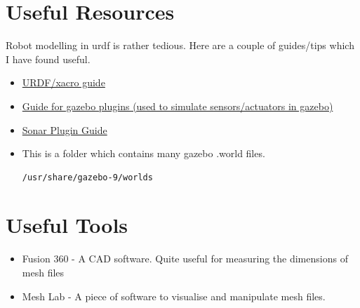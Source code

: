 \documentclass[11pt]{article}
\begin{document}
\tableofcontents

\section{Useful Resources}
Robot modelling in urdf is rather tedious. Here are a couple of guides/tips which I have found useful.


\begin{itemize}
 \item {
       \href{https://nu-msr.github.io/me495_site/lecture06_modeling.html}{URDF/xacro guide}
       }
 \item{
       \href{   https://classic.gazebosim.org/tutorials?tut=ros_gzplugins}{Guide for gazebo plugins (used to simulate sensors/actuators in gazebo)}
       }
 \item{
       \href{
        https://medium.com/teamarimac/integrating-sonar-and-ir-sensor-plugin-to-robot-model-in-gazebo-with-ros-656fd9452607
       }{Sonar Plugin Guide}
       }
 \item{
       This is a folder which contains many gazebo .world files.
       \begin{lstlisting}[language=bash]
        /usr/share/gazebo-9/worlds
       \end{lstlisting}
       }

\end{itemize}
\section{Useful Tools}
\begin{itemize}
 \item {Fusion 360 - A CAD software. Quite useful for measuring the dimensions of mesh files }
 \item { Mesh Lab - A piece of software to visualise and manipulate mesh files.}
\end{itemize}
\end{document}
